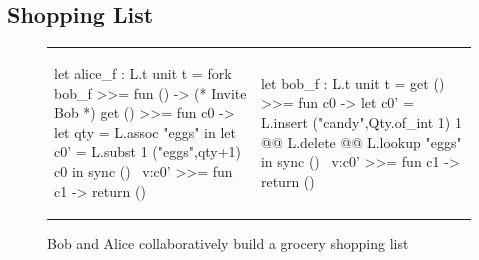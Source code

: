 \subsection{Shopping List}

\begin{figure}
\centering
\begin{tabular}{l||l}
\begin{ocaml}
let alice_f : L.t unit t =
  fork bob_f >>= fun () -> (* Invite Bob *)
  get () >>= fun c0 ->
  let qty = L.assoc "eggs" in
  let c0' = L.subst 1 ("eggs",qty+1) c0 in
  sync () ~v:c0' >>=
  fun c1 -> return ()
\end{ocaml}
&
\begin{ocaml}
let bob_f : L.t unit t =
  get () >>= fun c0 ->
  let c0' = L.insert ("candy",Qty.of_int 1) 1 @@
            L.delete @@ L.lookup "eggs" in
  sync () ~v:c0' >>=
  fun c1 -> return ()
\end{ocaml}
\\
\end{tabular}
\caption{Bob and Alice collaboratively build a grocery shopping list}
\label{fig:shopping-list-code}
\end{figure}

